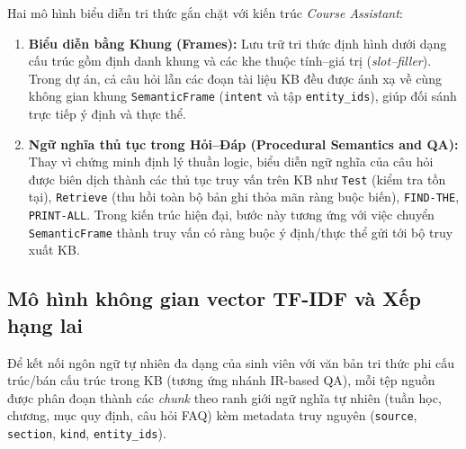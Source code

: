 Hai mô hình biểu diễn tri thức gắn chặt với kiến trúc \emph{Course Assistant}:
\begin{enumerate}
  \item \textbf{Biểu diễn bằng Khung (Frames):} Lưu trữ tri thức định hình dưới dạng cấu trúc gồm định danh khung và các khe thuộc tính--giá trị (\emph{slot--filler}). Trong dự án, cả câu hỏi lẫn các đoạn tài liệu KB đều được ánh xạ về cùng không gian khung \texttt{SemanticFrame} (\texttt{intent} và tập \texttt{entity\_ids}), giúp đối sánh trực tiếp ý định và thực thể.
  \item \textbf{Ngữ nghĩa thủ tục trong Hỏi--Đáp (Procedural Semantics and QA):} Thay vì chứng minh định lý thuần logic, biểu diễn ngữ nghĩa của câu hỏi được biên dịch thành các thủ tục truy vấn trên KB như \texttt{Test} (kiểm tra tồn tại), \texttt{Retrieve} (thu hồi toàn bộ bản ghi thỏa mãn ràng buộc biến), \texttt{FIND-THE}, \texttt{PRINT-ALL}. Trong kiến trúc hiện đại, bước này tương ứng với việc chuyển \texttt{SemanticFrame} thành truy vấn có ràng buộc ý định/thực thể gửi tới bộ truy xuất KB.
\end{enumerate}

\subsection{Mô hình không gian vector TF-IDF và Xếp hạng lai}

Để kết nối ngôn ngữ tự nhiên đa dạng của sinh viên với văn bản tri thức phi cấu trúc/bán cấu trúc trong KB (tương ứng nhánh IR-based QA), mỗi tệp nguồn được phân đoạn thành các \emph{chunk} theo ranh giới ngữ nghĩa tự nhiên (tuần học, chương, mục quy định, câu hỏi FAQ) kèm metadata truy nguyên (\texttt{source}, \texttt{section}, \texttt{kind}, \texttt{entity\_ids}).

